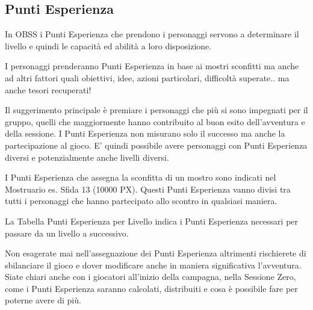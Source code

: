\begin{multicols}{2}
\subsection{Punti Esperienza}

\label{punti-esperienza}

In OBSS i Punti Esperienza che prendono i personaggi servono a determinare il livello e quindi le capacità ed abilità a loro disposizione.

I personaggi prenderanno Punti Esperienza in base ai mostri sconfitti ma anche ad altri fattori quali obiettivi, idee, azioni particolari, difficoltà superate.. ma anche tesori recuperati!

Il suggerimento principale è premiare i personaggi che più si sono impegnati per il gruppo, quelli che maggiormente hanno contribuito al buon esito dell'avventura e della sessione. I Punti Esperienza non misurano solo il successo ma anche la partecipazione al gioco.
E' quindi possibile avere personaggi con Punti Esperienza diversi e potenzialmente anche livelli diversi.

I Punti Esperienza che assegna la sconfitta di un mostro sono indicati nel Mostruario es. Sfida 13 (10000 PX). Questi Punti Esperienza vanno divisi tra tutti i personaggi che hanno partecipato allo scontro in qualsiasi maniera.

La Tabella Punti Esperienza per Livello indica i Punti Esperienza necessari per passare da un livello a successivo.

Non esagerate mai nell'assegnazione dei Punti Esperienza altrimenti rischierete di sbilanciare il gioco e dover modificare anche in maniera significativa l'avventura. Siate chiari anche con i giocatori all'inizio della campagna, nella Sessione Zero, come i Punti Esperienza saranno calcolati, distribuiti e cosa è possibile fare per poterne avere di più.



\end{multicols}
